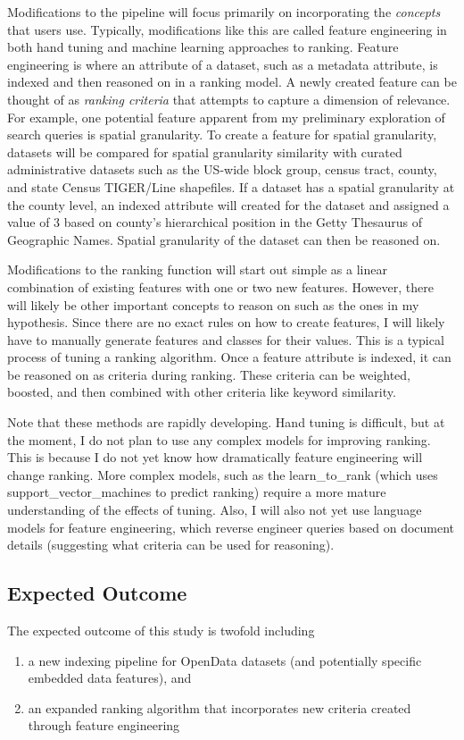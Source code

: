 Modifications to the pipeline will focus primarily on incorporating the \emph{concepts} that users use. Typically, modifications like this are called feature engineering in both hand tuning and machine learning approaches to ranking. Feature engineering is where an attribute of a dataset, such as a metadata attribute, is indexed and then reasoned on in a ranking model. A newly created feature can be thought of as \emph{ranking criteria} that attempts to capture a dimension of relevance. For example, one potential feature apparent from my preliminary exploration of search queries is spatial granularity. To create a feature for spatial granularity, datasets will be compared for spatial granularity similarity with curated administrative datasets such as the US-wide block group, census tract, county, and state Census TIGER/Line shapefiles. If a dataset has a spatial granularity at the county level, an indexed attribute will created for the dataset and assigned a value of 3 based on county’s hierarchical position in the Getty Thesaurus of Geographic Names. Spatial granularity of the dataset can then be reasoned on.

Modifications to the ranking function will start out simple as a linear combination of existing features with one or two new features. However, there will likely be other important concepts to reason on such as the ones in my hypothesis. Since there are no exact rules on how to create features, I will likely have to manually generate features and classes for their values. This is a typical process of tuning a ranking algorithm. Once a feature attribute is indexed, it can be reasoned on as criteria during ranking. These criteria can be weighted, boosted, and then combined with other criteria like keyword similarity.

Note that these methods are rapidly developing. Hand tuning is difficult, but at the moment, I do not plan to use any complex models for improving ranking. This is because I do not yet know how dramatically feature engineering will change ranking. More complex models, such as the \gls{learn_to_rank} (which uses \gls{support_vector_machines} to predict ranking) require a more mature understanding of the effects of tuning. Also, I will also not yet use language models for feature engineering, which reverse engineer queries based on document details (suggesting what criteria can be used for reasoning).

\subsection{Expected Outcome}
The expected outcome of this study is twofold including
\begin{enumerate}
    \item a new indexing pipeline for OpenData datasets (and potentially specific embedded data features), and 
    \item an expanded ranking algorithm that incorporates new criteria created through feature engineering
\end{enumerate}

